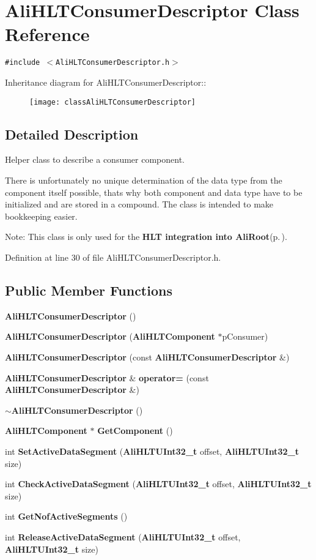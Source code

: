 \section{Ali\-HLTConsumer\-Descriptor Class Reference}
\label{classAliHLTConsumerDescriptor}
{\tt \#include $<$Ali\-HLTConsumer\-Descriptor.h$>$}

Inheritance diagram for Ali\-HLTConsumer\-Descriptor::\begin{figure}[H]
\begin{center}
\leavevmode
\texttt{[image: classAliHLTConsumerDescriptor]}
\end{center}
\end{figure}


\subsection{Detailed Description}
Helper class to describe a consumer component. 

There is unfortunately no unique determination of the data type from the component itself possible, thats why both component and data type have to be initialized and are stored in a compound. The class is intended to make bookkeeping easier.

\begin{Desc}
\item[Note:]This class is only used for the {\bf HLT integration into Ali\-Root}{\rm (p.\,\pageref{group__alihlt__system})}. \end{Desc}




Definition at line 30 of file Ali\-HLTConsumer\-Descriptor.h.\subsection*{Public Member Functions}
\begin{CompactItemize}
\item 
{\bf Ali\-HLTConsumer\-Descriptor} ()
\item 
{\bf Ali\-HLTConsumer\-Descriptor} ({\bf Ali\-HLTComponent} $\ast$p\-Consumer)
\item 
{\bf Ali\-HLTConsumer\-Descriptor} (const {\bf Ali\-HLTConsumer\-Descriptor} \&)
\item 
{\bf Ali\-HLTConsumer\-Descriptor} \& {\bf operator=} (const {\bf Ali\-HLTConsumer\-Descriptor} \&)
\item 
{\bf $\sim$Ali\-HLTConsumer\-Descriptor} ()
\item 
{\bf Ali\-HLTComponent} $\ast$ {\bf Get\-Component} ()
\item 
int {\bf Set\-Active\-Data\-Segment} ({\bf Ali\-HLTUInt32\_\-t} offset, {\bf Ali\-HLTUInt32\_\-t} size)
\item 
int {\bf Check\-Active\-Data\-Segment} ({\bf Ali\-HLTUInt32\_\-t} offset, {\bf Ali\-HLTUInt32\_\-t} size)
\item 
int {\bf Get\-Nof\-Active\-Segments} ()
\item 
int {\bf Release\-Active\-Data\-Segment} ({\bf Ali\-HLTUInt32\_\-t} offset, {\bf Ali\-HLTUInt32\_\-t} size)
\end{CompactItemize}
